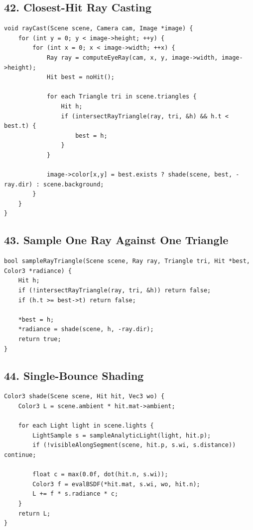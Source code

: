 \documentclass[10pt,letterpaper]{article}
\begin{document}
\subsection{42. Closest-Hit Ray Casting}

\begin{verbatim}
void rayCast(Scene scene, Camera cam, Image *image) {
    for (int y = 0; y < image->height; ++y) {
        for (int x = 0; x < image->width; ++x) {
            Ray ray = computeEyeRay(cam, x, y, image->width, image->height);
            Hit best = noHit();

            for each Triangle tri in scene.triangles {
                Hit h;
                if (intersectRayTriangle(ray, tri, &h) && h.t < best.t) {
                    best = h;
                }
            }

            image->color[x,y] = best.exists ? shade(scene, best, -ray.dir) : scene.background;
        }
    }
}
\end{verbatim}

\subsection{43. Sample One Ray Against One Triangle}

\begin{verbatim}
bool sampleRayTriangle(Scene scene, Ray ray, Triangle tri, Hit *best, Color3 *radiance) {
    Hit h;
    if (!intersectRayTriangle(ray, tri, &h)) return false;
    if (h.t >= best->t) return false;

    *best = h;
    *radiance = shade(scene, h, -ray.dir);
    return true;
}
\end{verbatim}

\subsection{44. Single-Bounce Shading}

\begin{verbatim}
Color3 shade(Scene scene, Hit hit, Vec3 wo) {
    Color3 L = scene.ambient * hit.mat->ambient;

    for each Light light in scene.lights {
        LightSample s = sampleAnalyticLight(light, hit.p);
        if (!visibleAlongSegment(scene, hit.p, s.wi, s.distance)) continue;

        float c = max(0.0f, dot(hit.n, s.wi));
        Color3 f = evalBSDF(*hit.mat, s.wi, wo, hit.n);
        L += f * s.radiance * c;
    }
    return L;
}
\end{verbatim}
\end{document}
